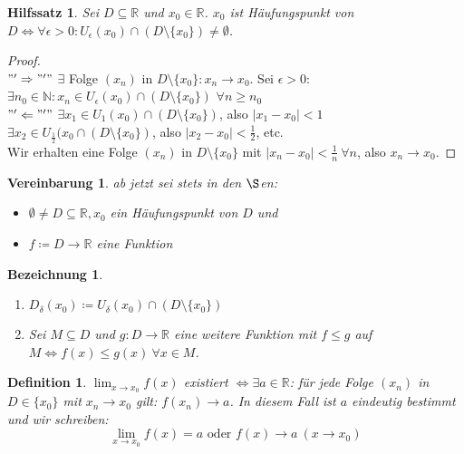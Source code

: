 \documentclass[14pt,titlepage,ngerman,a4paper,headsepline,DIV15,halfparskip*]{scrartcl}
\newcommand{\N}{\mathbb{N}}
\newcommand{\R}{\mathbb{R}}
\theoremstyle{named}
\theoremstyle{dotless}
\newtheorem{hilfssatz}[namedtheorem]{Hilfssatz}
\newtheorem*{bezeichnung}{Bezeichnung}
\newtheorem*{definition}{Definition}
\newtheorem*{vereinbarung}{Vereinbarung}
\begin{document}
\begin{hilfssatz} \label{6.1:hsatz}
	Sei $D \subseteq \R$ und $x_{0} \in \R$. $x_{0}$ ist Häufungspunkt von $D \iff \forall \epsilon > 0: U_{\epsilon}(x_{0}) \cap (D \setminus \{ x_{0} \}) \neq \emptyset$.
\end{hilfssatz}

\begin{proof} ~\\
	$"'\Rightarrow"'"$ $\exists$ Folge $(x_{n})$ in $D \setminus \{ x_{0} \} : x_{n} \rightarrow x_{0}$. Sei $\epsilon > 0$: $\exists n_{0} \in \N: x_{n} \in U_{\epsilon}(x_{0}) \cap (D \setminus \{ x_{0} \})$ $\forall n \geq n_{0}$ \\
	$"'\Leftarrow"'"$ $\exists x_{1} \in U_{1}(x_{0}) \cap (D \setminus \{ x_{0} \})$, also $|x_{1} - x_{0}| < 1$ $\exists x_{2} \in U_{\frac{1}{2}}(x_{0} \cap (D \setminus \{ x_{0} \})$, also $|x_{2} - x_{0}| < \frac{1}{2}$, etc. \\
	Wir erhalten eine Folge $(x_{n})$ in $D \setminus \{ x_{0} \}$ mit $|x_{n} - x_{0}| < \frac{1}{n} ~\forall n$, also $x_{n} \rightarrow x_{0}$.
\end{proof}


\begin{vereinbarung}
	ab jetzt sei stets in den $\S$en:
	\begin{itemize}
		\item $\emptyset \neq D \subseteq \R, x_{0}$ ein Häufungspunkt von $D$ und
		\item $f \coloneqq D \rightarrow \R$ eine Funktion	
	\end{itemize}
\end{vereinbarung}


\begin{bezeichnung} ~\
	\begin{enumerate}
		\item $D_{\delta}(x_{0}) \coloneqq U_{\delta}(x_{0}) \cap (D \setminus \{ x_{0} \})$
		\item Sei $M \subseteq D$ und $g \colon D \rightarrow \R$ eine weitere Funktion mit $f \leq g$ auf $M \iff f(x) \leq g(x) ~\forall x \in M$.
	\end{enumerate}
\end{bezeichnung}


\begin{definition}
	$\lim_{x \rightarrow x_{0}} f(x)$ existiert $\iff \exists a \in \R$: für jede Folge $(x_{n})$ in $D \in \{ x_{0} \}$ mit $x_{n} \rightarrow x_{0}$ gilt: $f(x_{n}) \rightarrow a$.
	In diesem Fall ist $a$ eindeutig bestimmt und wir schreiben:
		$$ \lim_{x \rightarrow x_{0}} f(x) = a \text{ oder } f(x) \rightarrow a ~(x \rightarrow x_{0}) $$
\end{definition}
\end{document}
